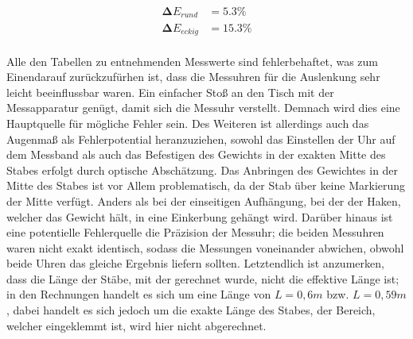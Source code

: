 \begin{align*}
    \symbf{\Delta}E_{rund} &= 5.3 \% \\
    \symbf{\Delta}E_{eckig} &= 15.3 \%
\end{align*}
\\

\noindent Alle den Tabellen zu entnehmenden Messwerte sind fehlerbehaftet, was 
zum Einendarauf zurückzufürhen ist, dass die Messuhren für die Auslenkung sehr 
leicht beeinflussbar waren. Ein einfacher Stoß an den Tisch mit der Messapparatur 
genügt, damit sich die Messuhr verstellt. Demnach wird dies eine Hauptquelle
für mögliche Fehler sein. Des Weiteren ist allerdings auch das Augenmaß als 
Fehlerpotential heranzuziehen, sowohl das Einstellen der Uhr auf dem Messband
als auch das Befestigen des Gewichts in der exakten Mitte des Stabes erfolgt
durch optische Abschätzung. Das Anbringen des Gewichtes in der Mitte des 
Stabes ist vor Allem problematisch, da der Stab über keine Markierung der Mitte
verfügt. Anders als bei der einseitigen Aufhängung, bei der der Haken, welcher 
das Gewicht hält, in eine Einkerbung gehängt wird. Darüber hinaus ist eine 
potentielle Fehlerquelle die Präzision der Messuhr; die beiden Messuhren waren
nicht exakt identisch, sodass die Messungen voneinander abwichen, obwohl beide 
Uhren das gleiche Ergebnis liefern sollten. Letztendlich ist anzumerken, dass 
die Länge der Stäbe, mit der gerechnet wurde, nicht die effektive Länge ist;
in den Rechnungen handelt es sich um eine Länge von $L = 0,6m$ bzw. $L = 0,59m$,
dabei handelt es sich jedoch um die exakte Länge des Stabes, der Bereich, welcher
eingeklemmt ist, wird hier nicht abgerechnet.